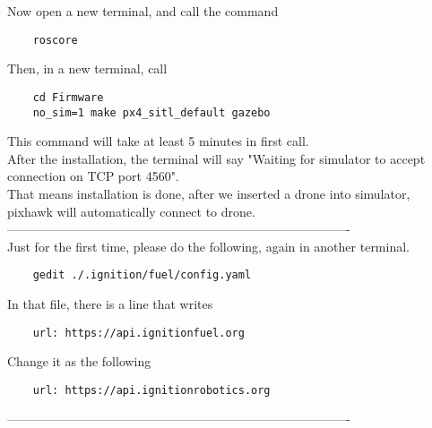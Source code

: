\documentclass{article}
\begin{document}
Now open a new terminal, and call the command \\
\begin{verbatim}
    roscore
\end{verbatim}
\noindent
Then, in a new terminal, call \\
\begin{verbatim}
    cd Firmware
    no_sim=1 make px4_sitl_default gazebo
\end{verbatim}
\noindent
This command will take at least 5 minutes in first call. \\
After the installation, the terminal will say "Waiting for simulator to accept connection on TCP port 4560". \\
That means installation is done, after we inserted a drone into simulator, pixhawk will automatically connect to drone. \\
---------------------------------------------------------------------------------- \\
Just for the first time, please do the following, again in another terminal. \\
\begin{verbatim}
    gedit ./.ignition/fuel/config.yaml
\end{verbatim}
\noindent
In that file, there is a line that writes \\
\begin{verbatim}
    url: https://api.ignitionfuel.org
\end{verbatim}
\noindent
Change it as the following \\
\begin{verbatim}
    url: https://api.ignitionrobotics.org
\end{verbatim}
\noindent
---------------------------------------------------------------------------------- \\
\end{document}
